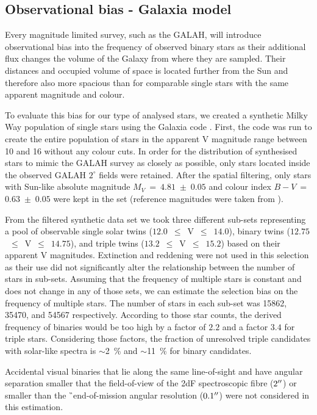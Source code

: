 \subsection{Observational bias - Galaxia model}
\label{sec:bias}
Every magnitude limited survey, such as the GALAH, will introduce observational bias into the frequency of observed binary stars as their additional flux changes the volume of the Galaxy from where they are sampled. Their distances and occupied volume of space is located further from the Sun and therefore also more spacious than for comparable single stars with the same apparent magnitude and colour.

To evaluate this bias for our type of analysed stars, we created a synthetic Milky Way population of single stars using the Galaxia code \cite{2011ApJ...730....3S}. First, the code was run to create the entire population of stars in the apparent V magnitude range between 10 and 16 without any colour cuts. In order for the distribution of synthesised stars to mimic the GALAH survey as closely as possible, only stars located inside the observed GALAH $2^\circ$ fields were retained. After the spatial filtering, only stars with Sun-like absolute magnitude $M_V~=~4.81$~$\pm$~$0.05$ and colour index $B-V$~=~$0.63$~$\pm$~$0.05$ were kept in the set (reference magnitudes were taken from \citet{2018ApJS..236...47W}).

From the filtered synthetic data set we took three different sub-sets representing a pool of observable single solar twins ($12.0$~$\leq$~V~$\leq$~$14.0$), binary twins ($12.75$~$\leq$~V~$\leq$~$14.75$), and triple twins ($13.2$~$\leq$~V~$\leq$~$15.2$) based on their apparent V magnitudes. Extinction and reddening were not used in this selection as their use did not significantly alter the relationship between the number of stars in sub-sets. Assuming that the frequency of multiple stars is constant and does not change in any of those sets, we can estimate the selection bias on the frequency of multiple stars. The number of stars in each sub-set was 15862, 35470, and 54567 respectively. According to those star counts, the derived frequency of binaries would be too high by a factor of $2.2$ and a factor $3.4$ for triple stars. Considering those factors, the fraction of unresolved triple candidates with solar-like spectra is $\sim$2~\% and $\sim$11~\% for binary candidates. 

Accidental visual binaries that lie along the same line-of-sight and have angular separation smaller that the field-of-view of the 2dF spectroscopic fibre ($2 \hbox{$^{\prime\prime}$}$) or smaller than the \G\ end-of-mission angular resolution ($0.1 \hbox{$^{\prime\prime}$}$) were not considered in this estimation.

